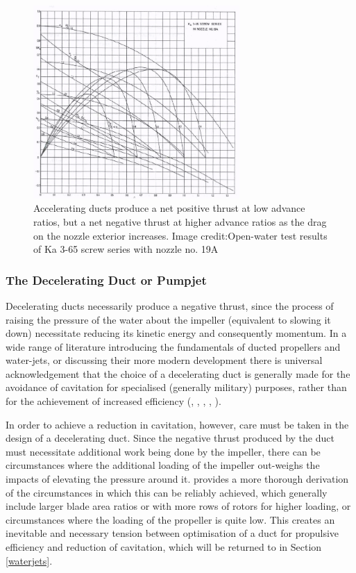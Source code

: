 \documentclass{article}\usepackage[]{graphicx}\usepackage[]{color}
\begin{document}
\begin{figure}[h]
\captionsetup{width=0.7\textwidth}
\includegraphics[width=0.7\textwidth, center]{DuctedEfficiency.png}
\caption{Accelerating ducts produce a net positive thrust at low advance ratios, but a net negative thrust at higher advance ratios as the drag on the nozzle exterior increases. Image credit:Open-water test results of Ka 3-65 screw series with nozzle no. 19A \parencite{oosterveld1970}}
\label{fig:DuctedEfficiency.png}
\end{figure}

\subsubsection{The Decelerating Duct or Pumpjet}
Decelerating ducts necessarily produce a negative thrust, since the process of raising the pressure of the water about the impeller (equivalent to slowing it down) necessitate reducing its kinetic energy and consequently momentum.  In a wide range of literature introducing the fundamentals of ducted propellers and water-jets, or discussing their more modern development there is universal acknowledgement that the choice of a decelerating duct is generally made for the avoidance of cavitation for specialised (generally military) purposes, rather than for the achievement of increased efficiency (\cite{carlton2007}, \cite{oosterveld1970}, \cite{mollard2011}, \cite{haimov2010}, \cite{lewis1988}).

In order to achieve a reduction in cavitation, however, care must be taken in the design of a decelerating duct.  Since the negative thrust produced by the duct must necessitate additional work being done by the impeller, there can be circumstances where the additional loading of the impeller out-weighs the impacts of elevating the pressure around it. \cite[24-25]{oosterveld1970} provides a more thorough derivation of the circumstances in which this can be reliably achieved, which generally include larger blade area ratios or with more rows of rotors for higher loading, or circumstances where the loading of the propeller is quite low.  This creates an inevitable and necessary tension between optimisation of a duct for propulsive efficiency and reduction of cavitation, which will be returned to in Section \ref{waterjets}.
\end{document}

